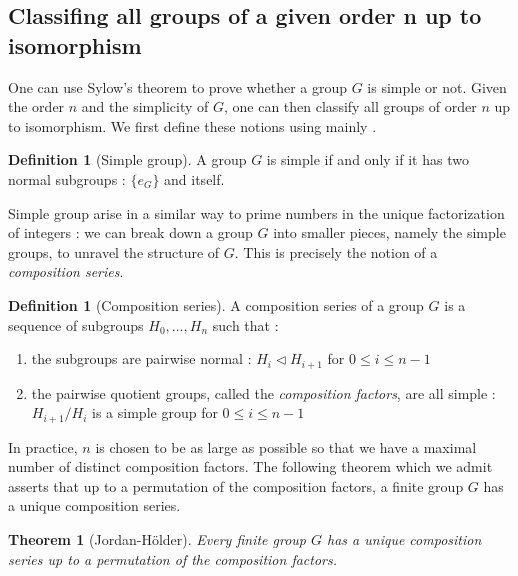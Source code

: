 \documentclass{article}
\theoremstyle{definition}
\theoremstyle{plain}
\theoremstyle{plain}
\theoremstyle{plain}
\theoremstyle{plain}
\theoremstyle{definition}
\newtheorem{defeng}[subsubsection]{Definition}
\theoremstyle{plain}
\newtheorem{thmeng}[subsubsection]{Theorem}
\theoremstyle{plain}
\begin{document}
\subsection{Classifing all groups of a given order n up to isomorphism}

\par One can use Sylow's theorem to prove whether a group \( G \) is simple or not. Given the order \( n \) and the simplicity of \( G \), one can then classify all groups of order \( n \) up to isomorphism. We first define these notions using mainly \cite[p.~103]{dummit2003abstract}.


\begin{defeng}[Simple group]
	A group \( G \) is simple if and only if it has two normal subgroups : 
	\( \{e_G\} \) and itself.
\end{defeng}

\par Simple group arise in a similar way to prime numbers in the unique factorization of integers : we can break down a group \( G \) into smaller pieces, namely the simple groups, to unravel the structure of \( G \).
This is precisely the notion of a \textit{composition series}.

\begin{defeng}[Composition series]
	A composition series of a group \( G \) is a sequence of subgroups \( H_0, \ldots, H_n \) such that :
	\begin{enumerate}[label = (\roman*)]
	\item the subgroups are pairwise normal : 
		\( H_i \triangleleft H_{i+1} \) for \( 0 \leq i \leq n-1 \)
	\item the pairwise quotient groups, called the \textit{composition factors}, are all simple :
		\( H_{i+1}/H_{i} \) is a simple group for \( 0 \leq i \leq n-1 \)

	\end{enumerate}
\par In practice, \( n \) is chosen to be as large as possible so that we have
a maximal number of distinct composition factors. The following theorem which we admit asserts that up to a permutation of the composition factors, a finite group \( G \) has a unique composition series.

\begin{thmeng}[Jordan-Hölder]
	Every finite group \( G \) has a unique composition series up to a permutation of the composition factors.	
\end{thmeng}
\end{defeng}
\end{document}
